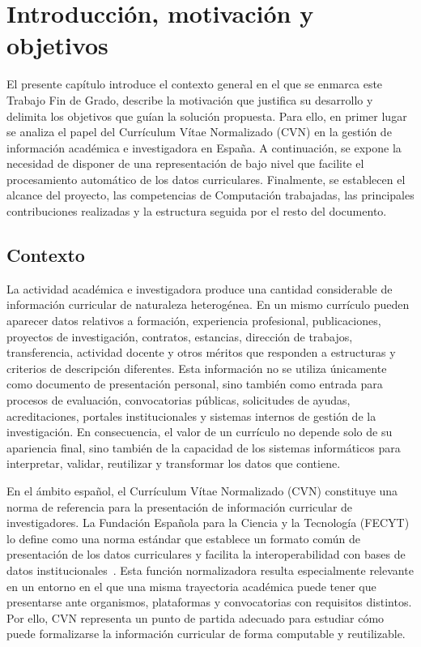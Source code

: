 \chapter{Introducción, motivación y objetivos}
\label{cap:introduccion}

El presente capítulo introduce el contexto general en el que se enmarca este
Trabajo Fin de Grado, describe la motivación que justifica su desarrollo y
delimita los objetivos que guían la solución propuesta. Para ello, en primer
lugar se analiza el papel del Currículum Vítae Normalizado (CVN) en la gestión de
información académica e investigadora en España. A continuación, se expone la
necesidad de disponer de una representación de bajo nivel que facilite el
procesamiento automático de los datos curriculares. Finalmente, se establecen el
alcance del proyecto, las competencias de Computación trabajadas, las principales
contribuciones realizadas y la estructura seguida por el resto del documento.

\section{Contexto}
\label{sec:introduccion_contexto}

La actividad académica e investigadora produce una cantidad considerable de
información curricular de naturaleza heterogénea. En un mismo currículo pueden
aparecer datos relativos a formación, experiencia profesional, publicaciones,
proyectos de investigación, contratos, estancias, dirección de trabajos,
transferencia, actividad docente y otros méritos que responden a estructuras y
criterios de descripción diferentes. Esta información no se utiliza únicamente
como documento de presentación personal, sino también como entrada para procesos
de evaluación, convocatorias públicas, solicitudes de ayudas, acreditaciones,
portales institucionales y sistemas internos de gestión de la investigación. En
consecuencia, el valor de un currículo no depende solo de su apariencia final,
sino también de la capacidad de los sistemas informáticos para interpretar,
validar, reutilizar y transformar los datos que contiene.

En el ámbito español, el Currículum Vítae Normalizado (CVN) constituye una norma
de referencia para la presentación de información curricular de investigadores. La
Fundación Española para la Ciencia y la Tecnología (FECYT) lo define como una
norma estándar que establece un formato común de presentación de los datos
curriculares y facilita la interoperabilidad con bases de datos
institucionales~\cite{cvn_web}. Esta función normalizadora resulta especialmente
relevante en un entorno en el que una misma trayectoria académica puede tener que
presentarse ante organismos, plataformas y convocatorias con requisitos distintos.
Por ello, CVN representa un punto de partida adecuado para estudiar cómo puede
formalizarse la información curricular de forma computable y reutilizable.

